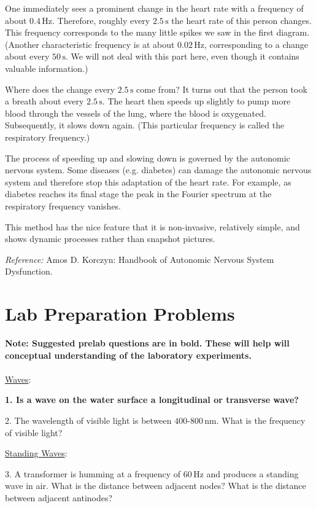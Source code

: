 One immediately sees a prominent change in the heart rate with a frequency of about $0.4\, \textrm{Hz}$. Therefore, roughly every $2.5\, \textrm{s}$ the heart rate of this person changes. This frequency corresponds to the many little spikes we saw in the first diagram. (Another characteristic frequency is at about $0.02\, \textrm{Hz}$, corresponding to a change about every $50\, \textrm{s}$. We will not deal with this part here, even though it contains valuable information.)\myskip

Where does the change every $2.5\, \textrm{s}$ come from? It turns out that the person took a breath about every $2.5\, \textrm{s}$. The heart then speeds up slightly to pump more blood through the vessels of the lung, where the blood is oxygenated. Subsequently, it slows down again. (This particular frequency is called the respiratory frequency.)\myskip

The process of speeding up and slowing down is governed by the autonomic nervous system. Some diseases (e.g. diabetes) can damage the autonomic nervous system and therefore stop this adaptation of the heart rate. For example, as diabetes reaches its final stage the peak in the Fourier spectrum at the respiratory frequency vanishes. \myskip

This method has the nice feature that it is non-invasive, relatively simple, and shows dynamic processes rather than snapshot pictures.\myskip

\emph{Reference:} Amos D. Korczyn: Handbook of Autonomic Nervous System Dysfunction.
\section{Lab Preparation Problems}
\myskip
{\bf{Note: Suggested prelab questions are in bold. These will help will conceptual understanding of the laboratory experiments.}}
\\
\\
\noindent\underline{Waves}:\myskip

{\bf{1. Is a wave on the water surface a longitudinal or transverse wave?}}\myskip

2. The wavelength of visible light is between $400$-$800\, \textrm{nm}$. What is the frequency of visible light?\myskip

\noindent\underline{Standing Waves}:\myskip

 3. A transformer is humming at a frequency of $60\, \textrm{Hz}$ and produces a standing wave in air. What is the distance between adjacent nodes? What is the distance between adjacent antinodes? \myskip

